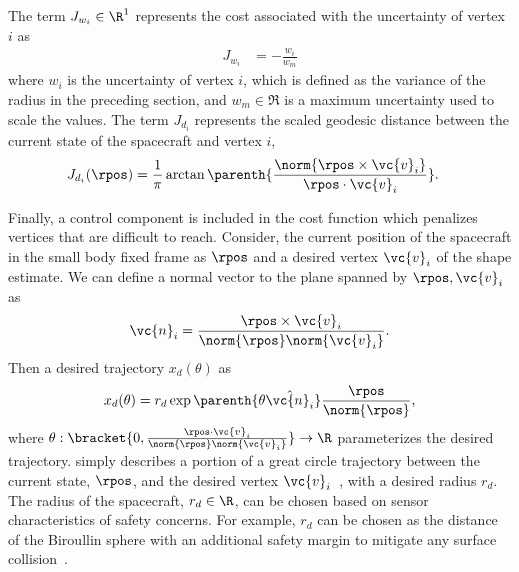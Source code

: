\documentclass[smallextended]{svjour3}       %
\begin{document}
The term \( J_{w_i} \in \R^1 \) represents the cost associated with the uncertainty of vertex \( i \) as
\begin{align}\label{eq:weight_cost}
    J_{w_i} &= - \frac{w_i}{w_m}
\end{align}
where \( w_i \) is the uncertainty of vertex \( i \), which is defined as the variance of the radius in the preceding section, and \( w_m \in\Re \) is a maximum uncertainty used to scale the values.
The term \( J_{d_i} \) represents the scaled geodesic distance between the current state of the spacecraft and vertex \( i \),
\begin{align}\label{eq:distance_cost}
    J_{d_i}(\rpos) &= \frac{1}{\pi} \arctan \parenth{ \frac{\norm{\rpos \times \vc{v}_i}}{\rpos \cdot \vc{v}_i}}.
\end{align}

Finally, a control component is included in the cost function which penalizes vertices that are difficult to reach.
Consider, the current position of the spacecraft in the small body fixed frame as \( \rpos\) and a desired vertex \( \vc{v}_i \) of the shape estimate.
We can define a normal vector to the plane spanned by \( \rpos, \vc{v}_i \) as
\begin{align}\label{eq:normal_to_plane}
    \vc{n}_i = \frac{\rpos \times \vc{v}_i}{\norm{\rpos} \norm{\vc{v}_i}}.
\end{align}
Then a desired trajectory \( x_d(\theta) \) as
\begin{align}\label{eq:spherical_waypoint}
    x_d(\theta) = r_d \exp{\parenth{\theta \hat{\vc{n}_i}} } \frac{\rpos}{\norm{\rpos}},
\end{align}
where \( \theta : \bracket{0, \frac{\rpos \cdot \vc{v}_i}{\norm{\rpos}\norm{\vc{v}_i}}} \to \R\) parameterizes the desired trajectory.
 simply describes a portion of a great circle trajectory between the current state, \( \rpos \), and the desired vertex \( \vc{v}_i \)~\cite{chen2016}, with a desired radius $r_d$.
The radius of the spacecraft, \( r_d \in \R \), can be chosen based on sensor characteristics of safety concerns.
For example, \( r_d \) can be chosen as the distance of the Biroullin sphere with an additional safety margin to mitigate any surface collision~\cite{scheeres2012a}.
\end{document}
